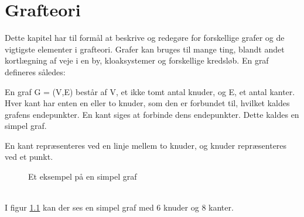 \chapter{Grafteori}
Dette kapitel har til formål at beskrive og redegøre for forskellige grafer og de vigtigste elementer i grafteori. 
Grafer kan bruges til mange ting, blandt andet kortlægning af veje i en by, kloaksystemer og forskellige kredsløb.
En graf defineres således: 
\begin{defn}
En graf G = (V,E) består af V, et ikke tomt antal knuder, og E, et antal kanter.
Hver kant har enten en eller to knuder, som den er forbundet til, hvilket kaldes grafens endepunkter.
En kant siges at forbinde dens endepunkter. Dette kaldes en simpel graf.

\end{defn}
\noindent En kant repræsenteres ved en linje mellem to knuder, og knuder repræsenteres ved et punkt.
\begin{figure}[h]
\centering
{}
\caption{Et eksempel på en simpel graf} \label{simpel_graf}
\end{figure}
\\ I figur \ref{simpel_graf} kan der ses en simpel graf med 6 knuder og 8 kanter.
